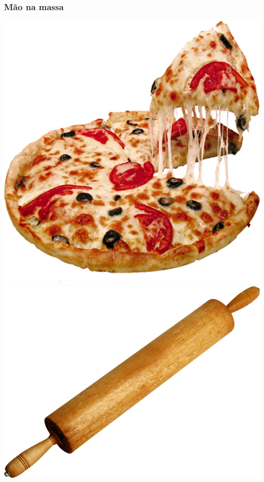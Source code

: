 \documentclass[12pt]{beamer}
\begin{document}
\begin{frame}
    \frametitle{Mão na massa}
    \includegraphics[width=\textwidth]{pizza.png}
    \includegraphics[width=\textwidth]{rolo.png}

\end{frame}
\end{document}
